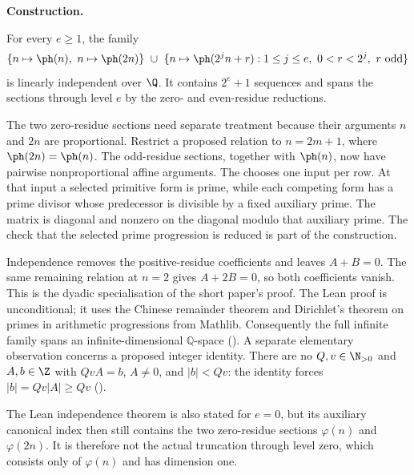 \textbf{Construction.}
\begin{thm}\label{thm:exact-dyadic-rank-infinite-dimensionality}
For every $e\ge1$, the family
\[
 \{n\mapsto\ph(n),\ n\mapsto\ph(2n)\}
 \ \cup\ \{n\mapsto\ph(2^j n+r):1\le j\le e,\ 0<r<2^j,\ r\text{ odd}\}
\]
is linearly independent over $\Q$. It contains $2^e+1$ sequences and spans
the sections through level $e$ by the zero- and even-residue reductions.
\end{thm}
The two zero-residue sections need separate treatment because their
arguments $n$ and $2n$ are proportional. Restrict a proposed relation
to $n=2m+1$, where $\ph(2n)=\ph(n)$. The odd-residue sections,
together with $\ph(n)$, now have pairwise nonproportional affine
arguments. The 
chooses one input per row. At that input a selected primitive form is
prime, while each competing form has a prime divisor whose predecessor
is divisible by a fixed auxiliary prime. The matrix is diagonal and
nonzero on the diagonal modulo that auxiliary prime. The check that
the selected prime progression is reduced is part of the construction.

Independence removes the positive-residue coefficients and leaves
$A+B=0$. The same remaining relation at $n=2$ gives $A+2B=0$, so
both coefficients vanish. This is the dyadic specialisation of the
short paper's proof. The Lean proof is unconditional; it uses the Chinese
remainder theorem and Dirichlet's theorem on primes in arithmetic
progressions from Mathlib. Consequently the full
infinite family spans an infinite-dimensional \(\mathbb Q\)-space
().
A separate elementary observation concerns a proposed integer identity.
There are no $Q,v\in\N_{>0}$ and $A,b\in\Z$ with
$QvA=b$, $A\ne0$, and $|b|<Qv$: the identity forces
$|b|=Qv|A|\ge Qv$
().

The Lean independence theorem is also stated for \(e=0\), but its auxiliary
canonical index then still contains the two zero-residue sections
\(\varphi(n)\) and \(\varphi(2n)\).  It is therefore not the actual truncation
through level zero, which consists only of \(\varphi(n)\) and has dimension one.

